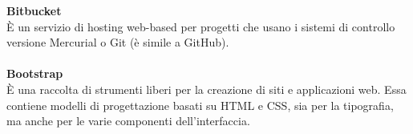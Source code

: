 \textbf{Bitbucket}\\
È un servizio di hosting web-based per progetti che usano i sistemi di controllo versione Mercurial o Git (è simile a GitHub). \\ \\
\textbf{Bootstrap}\\
È una raccolta di strumenti liberi per la creazione di siti e applicazioni web. Essa contiene modelli di progettazione basati su HTML e CSS, sia per la tipografia, ma anche per le varie componenti dell'interfaccia. \\ \\
\clearpage